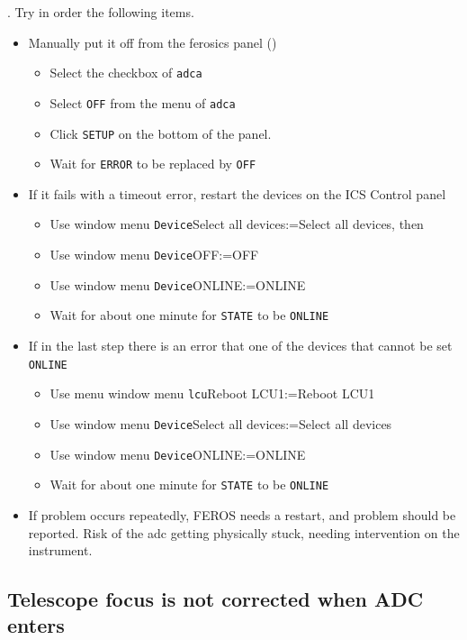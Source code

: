 \documentclass[11pt,fleqn,a4paper]{book}
\makeatletter
\def\menu#1#2{\texttt{#1}\ifx{}#2\else\@for\@x:=#2\do{$\rightarrow$\texttt{\@x}}\fi}
\def\wmenu#1#2{window menu \menu{#1}{#2}}
\makeatother
\begin{document}
. Try in order the following items.
\begin{itemize}
  \item Manually put it off from the \gls{ferosics} panel ()
     \begin{itemize}
      \item Select the checkbox of \texttt{adca}
      \item Select \texttt{OFF} from the menu of \texttt{adca} 
      \item Click \texttt{SETUP} on the bottom of the panel.
      \item Wait for \texttt{ERROR} to be replaced by \texttt{OFF}
      \end{itemize}
  \item If it fails with a timeout error, restart the devices on the \gls{ICS Control} panel
     \begin{itemize}
      \item Use \wmenu{Device}{Select all devices}, then
      \item Use \wmenu{Device}{OFF}
      \item Use \wmenu{Device}{ONLINE}
      \item Wait for about one minute for \texttt{STATE} to be \texttt{ONLINE}
     \end{itemize}
  \item If in the last step there is an error that one of the devices that cannot be set
        \texttt{ONLINE}
      \begin{itemize}
       \item Use menu \wmenu{\gls{lcu}}{Reboot LCU1} 
       \item Use \wmenu{Device}{Select all devices}
       \item Use \wmenu{Device}{ONLINE}
        \item Wait for about one minute for \texttt{STATE} to be \texttt{ONLINE}
      \end{itemize}
  \item If problem occurs repeatedly, FEROS needs a restart, and problem
        should be reported.  Risk of the \gls{adc} 
        getting physically stuck, needing
        intervention on the instrument.
\end{itemize}
\newpage
\subsection{Telescope focus is not corrected when ADC enters}
\label{sec:focusadc}
\end{document}
